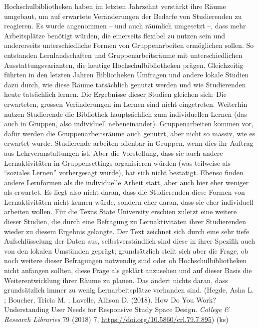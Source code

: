 \documentclass[a4paper,
fontsize=11pt,
oneside,
numbers=noperiodatend,
parskip=half-,
bibliography=totoc,
final
]{scrartcl}
\begin{document}
Hochschulbibliotheken haben im letzten Jahrzehnt verstärkt ihre Räume
umgebaut, um auf erwartete Veränderungen der Bedarfe von Studierenden zu
reagieren. Es wurde angenommen -- und auch räumlich umgesetzt --, dass
mehr Arbeitsplätze benötigt würden, die einerseits flexibel zu nutzen
sein und andererseits unterschiedliche Formen von Gruppenarbeiten
ermöglichen sollen. So entstanden Lernlandschaften und
Gruppenarbeitsräume mit unterschiedlichen Ausstattungsvarianten, die
heutige Hochschulbibliotheken prägen. Gleichzeitig führten in den
letzten Jahren Bibliotheken Umfragen und andere lokale Studien dazu
durch, wie diese Räume tatsächlich genutzt werden und wie Studierenden
heute tatsächlich lernen. Die Ergebnisse dieser Studien gleichen sich:
Die erwarteten, grossen Veränderungen im Lernen sind nicht eingetreten.
Weiterhin nutzen Studierende die Bibliothek hauptsächlich zum
individuellen Lernen (das auch in Gruppen, also individuell
nebeneinander). Gruppenarbeiten kommen vor, dafür werden die
Gruppenarbeitsräume auch genutzt, aber nicht so massiv, wie es erwartet
wurde. Studierende arbeiten offenbar in Gruppen, wenn dies ihr Auftrag
aus Lehrveranstaltungen ist. Aber die Vorstellung, dass sie auch andere
Lernaktivitäten in Gruppensettings organisieren würden (was teilweise
als \enquote{soziales Lernen} vorhergesagt wurde), hat sich nicht
bestätigt. Ebenso finden andere Lernformen als die individuelle Arbeit
statt, aber auch hier eher weniger als erwartet. Es liegt also nicht
daran, dass die Studierenden diese Formen von Lernaktivitäten nicht
kennen würde, sondern eher daran, dass sie eher individuell arbeiten
wollen. Für die Texas State University erschien zuletzt eine weitere
dieser Studien, die durch eine Befragung zu Lernaktivitäten ihrer
Studierenden wieder zu diesem Ergebnis gelangte. Der Text zeichnet sich
durch eine sehr tiefe Aufschlüsselung der Daten aus, selbstverständlich
sind diese in ihrer Spezifik auch von den lokalen Umständen geprägt;
grundsätzlich stellt sich aber die Frage, ob noch weitere dieser
Befragungen notwendig sind oder ob Hochschulbibliotheken nicht anfangen
sollten, diese Frage als geklärt anzusehen und auf dieser Basis die
Weiterentwicklung ihrer Räume zu planen. Das ändert nichts daran, dass
grundsätzlich immer zu wenig Lernarbeitsplätze vorhanden sind. (Hegde,
Asha L. ; Boucher, Tricia M. ; Lavelle, Allison D. (2018). How Do You
Work? Understanding User Needs for Responsive Study Space Design.
\emph{College \& Research Libraries} 79 (2018) 7,
\url{https://doi.org/10.5860/crl.79.7.895}) (ks)
\end{document}
